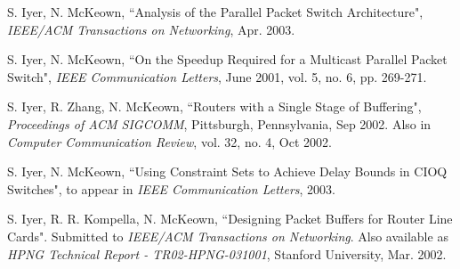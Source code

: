 \documentclass[a4paper, 10pt]{article}
\begin{document}
\begin{small}
\vspace{0.5cm}

\end{small}

\begin{footnotesize}

\begin{thebibliography}{}


S. Iyer, N. McKeown, ``Analysis of the Parallel Packet Switch Architecture", {\it IEEE/ACM Transactions on Networking}, Apr. 2003.

S. Iyer, N. McKeown, ``On the Speedup Required for a Multicast Parallel Packet Switch",
{\it IEEE Communication Letters}, June 2001, vol. 5, no. 6, pp. 269-271.

S. Iyer, R. Zhang, N. McKeown,
``Routers with a Single Stage of Buffering",
{\it Proceedings of ACM SIGCOMM}, Pittsburgh, Pennsylvania, Sep 2002. Also in
{\it Computer Communication Review}, vol. 32, no. 4, Oct 2002.

S. Iyer, N. McKeown, ``Using Constraint Sets to Achieve Delay Bounds in CIOQ Switches",
to appear in {\it IEEE Communication Letters}, 2003.



S. Iyer, R. R. Kompella, N. McKeown, ``Designing Packet Buffers for
Router Line Cards". Submitted to {\it IEEE/ACM Transactions on
Networking}. Also available as  {\it HPNG Technical Report -
TR02-HPNG-031001}, Stanford University, Mar. 2002.



\end{thebibliography}
\end{footnotesize}
\end{document}
